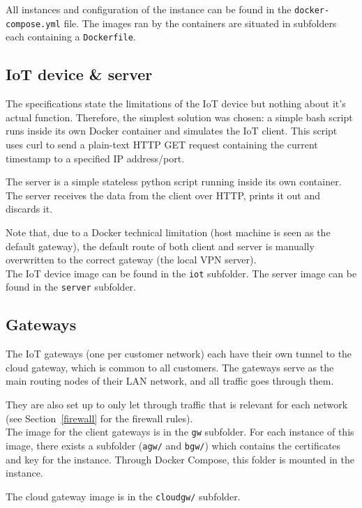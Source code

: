 \documentclass[paper=a4, fontsize=11pt]{scrartcl}
\begin{document}
All instances and configuration of the instance can be found in the
\texttt{docker-compose.yml} file.
The images ran by the containers are situated in subfolders each containing a
\texttt{Dockerfile}.

\subsection{IoT device \& server}

The specifications state the limitations of the IoT device but nothing about
it's actual function.
Therefore, the simplest solution was chosen: a simple bash script runs inside
its own Docker container and simulates the IoT client.
This script uses curl to send a plain-text HTTP GET request containing the
current timestamp to a specified IP address/port.

The server is a simple stateless python script running inside its
own container.
The server receives the data from the client over HTTP, prints it out and
discards it.

Note that, due to a Docker technical limitation (host machine is seen as the
default gateway), the default route of both client and server is manually
overwritten to the correct gateway (the local VPN server).
\\

The IoT device image can be found in the \texttt{iot} subfolder.
The server image can be found in the \texttt{server} subfolder.

\subsection{Gateways}

The IoT gateways (one per customer network) each have their own tunnel to the
cloud gateway, which is common to all customers.
The gateways serve as the main routing nodes of their LAN network, and all
traffic goes through them.

They are also set up to only let through traffic that is relevant for each
network (see Section~\ref{firewall} for the firewall rules).
\\

The image for the client gateways is in the \texttt{gw} subfolder.
For each instance of this image, there exists a subfolder (\texttt{agw/} and
\texttt{bgw/}) which contains the certificates and key for the instance.
Through Docker Compose, this folder is mounted in the instance.

The cloud gateway image is in the \texttt{cloudgw/} subfolder.
\end{document}
